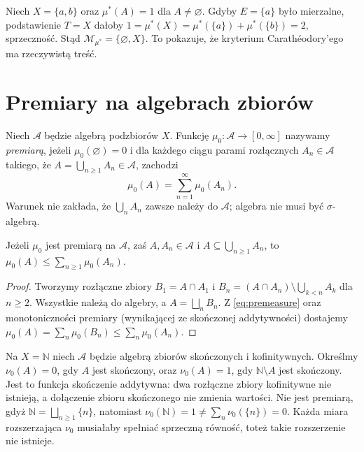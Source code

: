 \begin{przyklad}
Niech $X=\{a,b\}$ oraz $\mu^*(A)=1$ dla $A\ne\varnothing$.
Gdyby $E=\{a\}$ było mierzalne, podstawienie $T=X$ dałoby
$1=\mu^*(X)=\mu^*(\{a\})+\mu^*(\{b\})=2$,
sprzeczność. Stąd $\mathcal M_{\mu^*}=\{\varnothing,X\}$.
To pokazuje, że kryterium Carathéodory'ego ma rzeczywistą treść.
\end{przyklad}

\section{Premiary na algebrach zbiorów}

\begin{definicja}[Premiara]
\label{def:premeasure}
Niech $\mathcal A$ będzie algebrą podzbiorów $X$.
Funkcję $\mu_0:\mathcal A\to[0,\infty]$ nazywamy
\emph{premiarą}, jeżeli $\mu_0(\varnothing)=0$ i dla każdego
ciągu parami rozłącznych $A_n\in\mathcal A$ takiego, że
$A=\bigcup_{n\ge1}A_n\in\mathcal A$, zachodzi
\begin{equation}\label{eq:premeasure}
\mu_0(A)=\sum_{n=1}^\infty\mu_0(A_n).
\end{equation}
Warunek nie zakłada, że $\bigcup_nA_n$ zawsze należy do
$\mathcal A$; algebra nie musi być $\sigma$-algebrą.
\end{definicja}

\begin{lemat}
\label{lem:premeasure-cover}
Jeżeli $\mu_0$ jest premiarą na $\mathcal A$, zaś
$A,A_n\in\mathcal A$ i $A\subseteq\bigcup_{n\ge1}A_n$,
to $\mu_0(A)\le\sum_{n\ge1}\mu_0(A_n)$.
\end{lemat}

\begin{proof}
Tworzymy rozłączne zbiory
$B_1=A\cap A_1$ i
$B_n=(A\cap A_n)\setminus\bigcup_{k<n}A_k$ dla $n\ge2$.
Wszystkie należą do algebry, a $A=\bigsqcup_nB_n$.
Z \eqref{eq:premeasure} oraz monotoniczności premiary
(wynikającej ze skończonej addytywności) dostajemy
$\mu_0(A)=\sum_n\mu_0(B_n)\le\sum_n\mu_0(A_n)$.
\end{proof}

\begin{przyklad}
Na $X=\mathbb N$ niech $\mathcal A$ będzie algebrą
zbiorów skończonych i kofinitywnych. Określmy
$\nu_0(A)=0$, gdy $A$ jest skończony, oraz
$\nu_0(A)=1$, gdy $\mathbb N\setminus A$ jest skończony.
Jest to funkcja skończenie addytywna: dwa rozłączne
zbiory kofinitywne nie istnieją, a dołączenie zbioru
skończonego nie zmienia wartości. Nie jest premiarą, gdyż
$\mathbb N=\bigsqcup_{n\ge1}\{n\}$, natomiast
$\nu_0(\mathbb N)=1\ne\sum_n\nu_0(\{n\})=0$.
Każda miara rozszerzająca $\nu_0$ musiałaby spełniać
sprzeczną równość, toteż takie rozszerzenie nie istnieje.
\end{przyklad}

